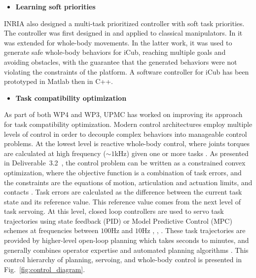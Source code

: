 \begin{itemize}
\item \textbf{Learning soft priorities}
\end{itemize}
INRIA also designed a multi-task prioritized controller with soft task priorities. The controller was first designed in \cite{Modugno2016} and applied to classical manipulators. In \cite{modugno2016learning} it was extended for whole-body movements. In the latter work, it was used to generate safe whole-body behaviors for iCub, reaching multiple goals and avoiding obstacles, with the guarantee that the generated behaviors were not violating the constraints of the platform. A software controller for iCub has been prototyped in Matlab then in C++.

\begin{itemize}
\item \textbf{Task compatibility optimization}
\end{itemize}
As part of both WP4 and WP3, UPMC has worked on improving its approach for task compatibility optimization. Modern control architectures employ multiple levels of control in order to decouple complex behaviors into manageable control problems. At the lowest level is reactive whole-body control, where joints torques are calculated at high frequency ($\sim1$kHz) given one or more tasks \cite{Khatib2004}. As presented in Deliverable~3.2~\cite{deliverable32}, the control problem can be written as a constrained convex optimization, where the objective function is a combination of task errors, and the constraints are the equations of motion, articulation and actuation limits, and contacts \cite{Salini2011, Saab2013, Bouyarmane2011}. Task errors are calculated as the difference between the current task state and its reference value. This reference value comes from the next level of task servoing. At this level, closed loop controllers are used to servo task trajectories using state feedback (PID) or Model Predictive Control (MPC) schemes at frequencies between $100$Hz and $10$Hz  \cite{Ibanez2014}, \cite{Koenemann2015}, \cite{Perrin2015}. These task trajectories are provided by higher-level open-loop planning which takes seconds to minutes, and generally combines operator expertise and automated planning algorithms \cite{Bouyarmane2012, Pham2014}. This control hierarchy of planning, servoing, and whole-body control is presented in Fig.~\ref{fig:control_diagram}.\\


